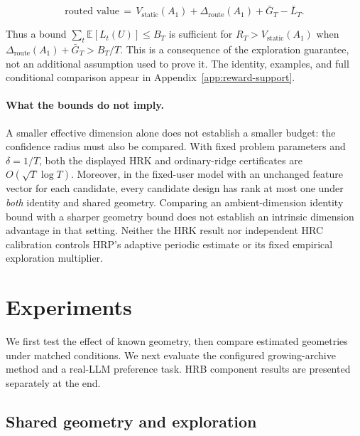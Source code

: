 \documentclass{article} %
\providecommand{\E}{\mathbb{E}}
\begin{document}
\begin{equation}
\label{eq:method-thesis}
\text{routed value}
\,=\, V_{\mathrm{static}}(A_1) + \Delta_{\mathrm{route}}(A_1) + \bar G_T - \bar L_T.
\end{equation}

Thus a bound $\sum_t\E[L_t(U)]\le B_T$ is sufficient for
$R_T>V_{\mathrm{static}}(A_1)$ when
$\Delta_{\mathrm{route}}(A_1)+\bar G_T>B_T/T$.
This is a consequence of the exploration guarantee, not an additional
assumption used to prove it. The identity, examples, and full conditional
comparison appear in Appendix~\ref{app:reward-support}.

\paragraph{What the bounds do not imply.}
A smaller effective dimension alone does not establish a smaller budget:
the confidence radius must also be compared. With fixed problem parameters
and $\delta=1/T$, both the displayed HRK and ordinary-ridge certificates
are $O(\sqrt T\log T)$. Moreover, in the fixed-user model with an unchanged
feature vector for each candidate, every candidate design has rank at most
one under \emph{both} identity and shared geometry. Comparing an
ambient-dimension identity bound with a sharper geometry bound does not
establish an intrinsic dimension advantage in that setting.
Neither the HRK result nor independent HRC calibration controls HRP's
adaptive periodic estimate or its fixed empirical exploration multiplier.

\section{Experiments}
\label{sec:experiments}

We first test the effect of known geometry, then compare estimated
geometries under matched conditions. We next evaluate the configured
growing-archive method and a real-LLM preference task. HRB component results
are presented separately at the end.

\subsection{Shared geometry and exploration}
\label{sec:exp-hyper-ridge-plan}
\end{document}
